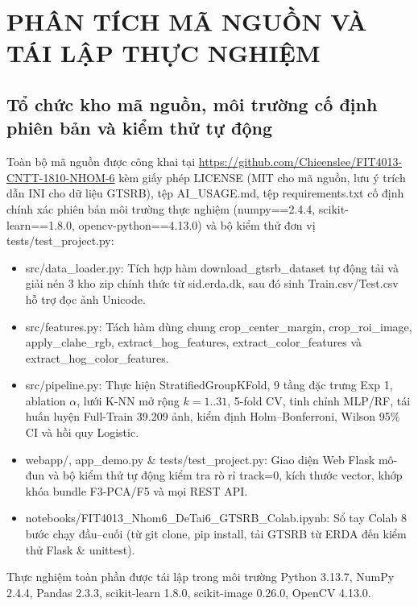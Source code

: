 \documentclass[conference]{IEEEtran}
\begin{document}
\section{PHÂN TÍCH MÃ NGUỒN VÀ TÁI LẬP THỰC NGHIỆM}

\subsection{Tổ chức kho mã nguồn, môi trường cố định phiên bản và kiểm thử tự động}
Toàn bộ mã nguồn được công khai tại \url{https://github.com/Chieenslee/FIT4013-CNTT-1810-NHOM-6} kèm giấy phép LICENSE (MIT cho mã nguồn, lưu ý trích dẫn INI cho dữ liệu GTSRB), tệp AI\_USAGE.md, tệp requirements.txt cố định chính xác phiên bản môi trường thực nghiệm (numpy==2.4.4, scikit-learn==1.8.0, opencv-python==4.13.0) và bộ kiểm thử đơn vị tests/test\_project.py:
\begin{itemize}
  \item src/data\_loader.py: Tích hợp hàm download\_\allowbreak{}gtsrb\_dataset tự động tải và giải nén 3 kho zip chính thức từ sid.erda.dk, sau đó sinh Train.csv/Test.csv hỗ trợ đọc ảnh Unicode.
  \item src/features.py: Tách hàm dùng chung crop\_\allowbreak{}center\_margin, crop\_roi\_image, apply\_clahe\_rgb, extract\_\allowbreak{}hog\_features, extract\_\allowbreak{}color\_features và extract\_hog\_\allowbreak{}color\_features.
  \item src/pipeline.py: Thực hiện StratifiedGroupKFold, 9 tầng đặc trưng Exp 1, ablation $\alpha$, lưới K-NN mở rộng $k=1..31$, 5-fold CV, tinh chỉnh MLP/RF, tái huấn luyện Full-Train 39.209 ảnh, kiểm định Holm--Bonferroni, Wilson 95\% CI và hồi quy Logistic.
  \item webapp/, app\_demo.py \& tests/test\_project.py: Giao diện Web Flask mô-đun và bộ kiểm thử tự động kiểm tra rò rỉ track=0, kích thước vector, khớp khóa bundle F3-PCA/F5 và mọi REST API.
  \item notebooks/\allowbreak{}FIT4013\_Nhom6\_\allowbreak{}DeTai6\_GTSRB\_Colab.ipynb: Sổ tay Colab 8 bước chạy đầu--cuối (từ git clone, pip install, tải GTSRB từ ERDA đến kiểm thử Flask \& unittest).
\end{itemize}

Thực nghiệm toàn phần được tái lập trong môi trường Python 3.13.7, NumPy 2.4.4, Pandas 2.3.3, scikit-learn 1.8.0, scikit-image 0.26.0, OpenCV 4.13.0.

\end{document}
